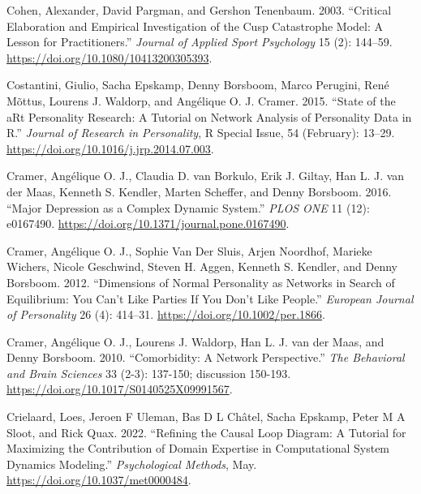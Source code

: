 \documentclass[
  a4paper,
  DIV=11,
  numbers=noendperiod,
  oneside]{scrreprt}
\newlength{\cslhangindent}
\newlength{\cslentryspacingunit} %
\newenvironment{CSLReferences}[2] %
 {%
  \setlength{\parindent}{0pt}
  \ifodd #1
  \let\oldpar\par
  \def\par{\hangindent=\cslhangindent\oldpar}
  \fi
  \setlength{\parskip}{#2\cslentryspacingunit}
 }%
 {}
\begin{document}
\begin{CSLReferences}{1}{0}
\leavevmode{}%
Cohen, Alexander, David Pargman, and Gershon Tenenbaum. 2003.
{``Critical {Elaboration} and {Empirical Investigation} of the {Cusp
Catastrophe Model}: {A Lesson} for {Practitioners}.''} \emph{Journal of
Applied Sport Psychology} 15 (2): 144--59.
\url{https://doi.org/10.1080/10413200305393}.

\leavevmode{}%
Costantini, Giulio, Sacha Epskamp, Denny Borsboom, Marco Perugini, René
Mõttus, Lourens J. Waldorp, and Angélique O. J. Cramer. 2015. {``State
of the {aRt} Personality Research: {A} Tutorial on Network Analysis of
Personality Data in {R}.''} \emph{Journal of Research in Personality}, R
{Special Issue}, 54 (February): 13--29.
\url{https://doi.org/10.1016/j.jrp.2014.07.003}.

\leavevmode{}%
Cramer, Angélique O. J., Claudia D. van Borkulo, Erik J. Giltay, Han L.
J. van der Maas, Kenneth S. Kendler, Marten Scheffer, and Denny
Borsboom. 2016. {``Major Depression as a Complex Dynamic System.''}
\emph{PLOS ONE} 11 (12): e0167490.
\url{https://doi.org/10.1371/journal.pone.0167490}.

\leavevmode{}%
Cramer, Angélique O. J., Sophie Van Der Sluis, Arjen Noordhof, Marieke
Wichers, Nicole Geschwind, Steven H. Aggen, Kenneth S. Kendler, and
Denny Borsboom. 2012. {``Dimensions of Normal Personality as Networks in
Search of Equilibrium: You Can't Like Parties If You Don't Like
People.''} \emph{European Journal of Personality} 26 (4): 414--31.
\url{https://doi.org/10.1002/per.1866}.

\leavevmode{}%
Cramer, Angélique O. J., Lourens J. Waldorp, Han L. J. van der Maas, and
Denny Borsboom. 2010. {``Comorbidity: A Network Perspective.''}
\emph{The Behavioral and Brain Sciences} 33 (2-3): 137-150; discussion
150-193. \url{https://doi.org/10.1017/S0140525X09991567}.

\leavevmode{}%
Crielaard, Loes, Jeroen F Uleman, Bas D L Châtel, Sacha Epskamp, Peter M
A Sloot, and Rick Quax. 2022. {``Refining the Causal Loop Diagram: {A}
Tutorial for Maximizing the Contribution of Domain Expertise in
Computational System Dynamics Modeling.''} \emph{Psychological Methods},
May. \url{https://doi.org/10.1037/met0000484}.


\end{CSLReferences}
\end{document}
